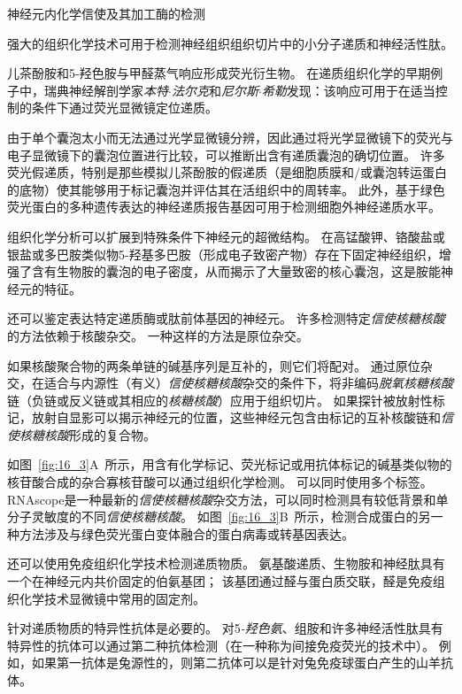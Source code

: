 \begin{proposition}[神经解剖学导航术语] \label{box:16_2}
	
	\quad \quad 神经元内化学信使及其加工酶的检测
	
	\quad \quad 强大的组织化学技术可用于检测神经组织组织切片中的小分子递质和神经活性肽。
	
	\quad \quad 儿茶酚胺和5-羟色胺与甲醛蒸气响应形成荧光衍生物。
	在递质组织化学的早期例子中，瑞典神经解剖学家\textit{本特$\cdot$法尔克}和\textit{尼尔斯$\cdot$希勒}发现：该响应可用于在适当控制的条件下通过荧光显微镜定位递质。
	
	\quad \quad 由于单个囊泡太小而无法通过光学显微镜分辨，因此通过将光学显微镜下的荧光与电子显微镜下的囊泡位置进行比较，可以推断出含有递质囊泡的确切位置。
	许多荧光假递质，特别是那些模拟儿茶酚胺的假递质（是细胞质膜和/或囊泡转运蛋白的底物）使其能够用于标记囊泡并评估其在活组织中的周转率。
	此外，基于绿色荧光蛋白的多种遗传表达的神经递质报告基因可用于检测细胞外神经递质水平。
	
	\quad \quad 组织化学分析可以扩展到特殊条件下神经元的超微结构。
	在高锰酸钾、铬酸盐或银盐或多巴胺类似物5-羟基多巴胺（形成电子致密产物）存在下固定神经组织，增强了含有生物胺的囊泡的电子密度，从而揭示了大量致密的核心囊泡，这是胺能神经元的特征。
	
	\quad \quad 还可以鉴定表达特定递质酶或肽前体基因的神经元。
	许多检测特定\textit{信使核糖核酸}的方法依赖于核酸杂交。
	一种这样的方法是原位杂交。
	
	\quad \quad 如果核酸聚合物的两条单链的碱基序列是互补的，则它们将配对。
	通过原位杂交，在适合与内源性（有义）\textit{信使核糖核酸}杂交的条件下，将非编码\textit{脱氧核糖核酸}链（负链或反义链或其相应的\textit{核糖核酸}）应用于组织切片。
	如果探针被放射性标记，放射自显影可以揭示神经元的位置，这些神经元包含由标记的互补核酸链和\textit{信使核糖核酸}形成的复合物。
	
	\quad \quad 如图~\ref{fig:16_3}A~所示，用含有化学标记、荧光标记或用抗体标记的碱基类似物的核苷酸合成的杂合寡核苷酸可以通过组织化学检测。
	可以同时使用多个标签。
	RNAscope是一种最新的\textit{信使核糖核酸}杂交方法，可以同时检测具有较低背景和单分子灵敏度的不同\textit{信使核糖核酸}。
	如图~\ref{fig:16_3}B~所示，检测合成蛋白的另一种方法涉及与绿色荧光蛋白变体融合的蛋白病毒或转基因表达。
	
	\quad \quad 还可以使用免疫组织化学技术检测递质物质。
	氨基酸递质、生物胺和神经肽具有一个在神经元内共价固定的伯氨基团；
	该基团通过醛与蛋白质交联，醛是免疫组织化学技术显微镜中常用的固定剂。
	
	\quad \quad 针对递质物质的特异性抗体是必要的。
	对5\textit{-羟色氨}、组胺和许多神经活性肽具有特异性的抗体可以通过第二种抗体检测（在一种称为间接免疫荧光的技术中）。
	例如，如果第一抗体是兔源性的，则第二抗体可以是针对兔免疫球蛋白产生的山羊抗体。
	

\end{proposition}
